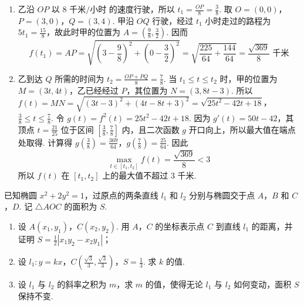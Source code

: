 \begin{solution}
\begin{enumerate}
\item 乙沿 \(OP\) 以 \(8\text{ 千米/小时}\) 的速度行驶，所以 \(t_{1}=\frac{OP}{8}=\frac{3}{8}\). 取 \(O=(0,0)\)，\(P=(3,0)\)，\(Q=(3,4)\). 甲沿 \(OQ\) 行驶，经过 \(t_{1}\) 小时走过的路程为 \(5t_{1}=\frac{15}{8}\)，故此时甲的位置为 \(A=\left(\frac{9}{8},\frac{3}{2}\right)\). 因而
\[
f(t_{1})=AP=\sqrt{\left(3-\frac{9}{8}\right)^{2}+\left(0-\frac{3}{2}\right)^{2}}=\sqrt{\frac{225}{64}+\frac{144}{64}}=\frac{\sqrt{369}}{8}\text{ 千米}
\]
\item 乙到达 \(Q\) 所需的时间为 \(t_{2}=\frac{OP+PQ}{8}=\frac{7}{8}\). 当 \(t_{1}\leqslant t\leqslant t_{2}\) 时，甲的位置为 \(M=(3t,4t)\)，乙已经经过 \(P\)，其位置为 \(N=(3,8t-3)\). 所以
\(f(t)=MN=\sqrt{(3t-3)^{2}+(4t-8t+3)^{2}}=\sqrt{25t^{2}-42t+18}\)，\(\frac{3}{8}\leqslant t\leqslant\frac{7}{8}\).
令 \(g(t)=f^{2}(t)=25t^{2}-42t+18\). 因为 \(g'(t)=50t-42\)，其顶点 \(t=\frac{21}{25}\) 位于区间 \(\left[\frac{3}{8},\frac{7}{8}\right]\) 内，且二次函数 \(g\) 开口向上，所以最大值在端点处取得. 计算得 \(g\left(\frac{3}{8}\right)=\frac{369}{64}\)，\(g\left(\frac{7}{8}\right)=\frac{25}{64}\). 因此
\[
\max_{t\in[t_{1},t_{2}]}f(t)=\frac{\sqrt{369}}{8}<3
\]
所以 \(f(t)\) 在 \([t_{1},t_{2}]\) 上的最大值不超过 \(3\text{ 千米}\).
\end{enumerate}
\end{solution}

\begin{problem}
已知椭圆 \(x^{2} + 2y^{2} = 1\)，过原点的两条直线 \(l_{1}\) 和 \(l_{2}\) 分别与椭圆交于点 \(A\)，\(B\) 和 \(C\)，\(D\). 记 \(\triangle AOC\) 的面积为 \(S\).
\begin{enumerate}
\item 设 \(A(x_{1}, y_{1})\)，\(C(x_{2}, y_{2})\). 用 \(A\)，\(C\) 的坐标表示点 \(C\) 到直线 \(l_{1}\) 的距离，并证明 \(S = \frac{1}{2} |x_{1}y_{2} - x_{2}y_{1}|\)；
\item 设 \(l_{1}: y = kx\)，\(C\left(\frac{\sqrt{3}}{3}, \frac{\sqrt{3}}{3}\right)\)，\(S = \frac{1}{3}\). 求 \(k\) 的值.
\item 设 \(l_{1}\) 与 \(l_{2}\) 的斜率之积为 \(m\)，求 \(m\) 的值，使得无论 \(l_{1}\) 与 \(l_{2}\) 如何变动，面积 \(S\) 保持不变.
\end{enumerate}
\end{problem}


